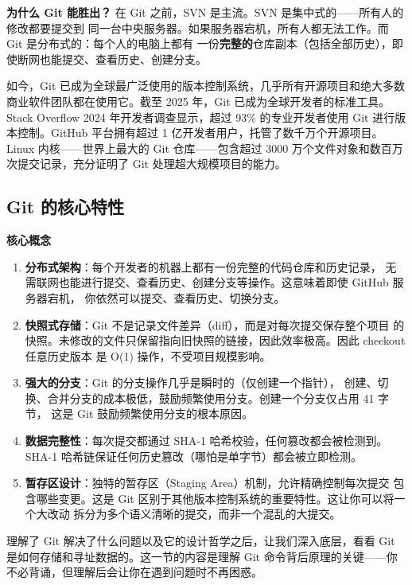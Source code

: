 \documentclass[12pt,a4paper,openany]{ctexbook}
\newenvironment{keybox}{%
  \medskip
  \noindent\textbf{\faKey\; 核心概念}
  \smallskip
}{%
  \medskip
}
\begin{document}
\textbf{为什么 Git 能胜出？} 在 Git 之前，SVN 是主流。SVN 是集中式的——所有人的修改都要提交到
同一台中央服务器。如果服务器宕机，所有人都无法工作。而 Git 是分布式的：每个人的电脑上都有
一份\textbf{完整的}仓库副本（包括全部历史），即使断网也能提交、查看历史、创建分支。

如今，Git 已成为全球最广泛使用的版本控制系统，几乎所有开源项目和绝大多数商业软件团队都在使用它。截至 2025 年，Git 已成为全球开发者的标准工具。Stack Overflow 2024 年开发者调查显示，超过 93\% 的专业开发者使用 Git 进行版本控制。GitHub 平台拥有超过 1 亿开发者用户，托管了数千万个开源项目。Linux 内核——世界上最大的 Git 仓库——包含超过 3000 万个文件对象和数百万次提交记录，充分证明了 Git 处理超大规模项目的能力。

\subsection{Git 的核心特性}

\begin{keybox}
\begin{enumerate}[leftmargin=1.5em]
  \item \textbf{分布式架构}：每个开发者的机器上都有一份完整的代码仓库和历史记录，
        无需联网也能进行提交、查看历史、创建分支等操作。这意味着即使 GitHub 服务器宕机，
        你依然可以提交、查看历史、切换分支。
  \item \textbf{快照式存储}：Git 不是记录文件差异（diff），而是对每次提交保存整个项目
        的快照。未修改的文件只保留指向旧快照的链接，因此效率极高。因此 checkout 任意历史版本
        是 O(1) 操作，不受项目规模影响。
  \item \textbf{强大的分支}：Git 的分支操作几乎是瞬时的（仅创建一个指针），
        创建、切换、合并分支的成本极低，鼓励频繁使用分支。创建一个分支仅占用 41 字节，
        这是 Git 鼓励频繁使用分支的根本原因。
  \item \textbf{数据完整性}：每次提交都通过 SHA-1 哈希校验，任何篡改都会被检测到。SHA-1 哈希链保证任何历史篡改（哪怕是单字节）都会被立即检测。
  \item \textbf{暂存区设计}：独特的暂存区（Staging Area）机制，允许精确控制每次提交
        包含哪些变更。这是 Git 区别于其他版本控制系统的重要特性。这让你可以将一个大改动
        拆分为多个语义清晰的提交，而非一个混乱的大提交。
\end{enumerate}
\end{keybox}

理解了 Git 解决了什么问题以及它的设计哲学之后，让我们深入底层，看看 Git 是如何存储和寻址数据的。这一节的内容是理解 Git 命令背后原理的关键——你不必背诵，但理解后会让你在遇到问题时不再困惑。
\end{document}
